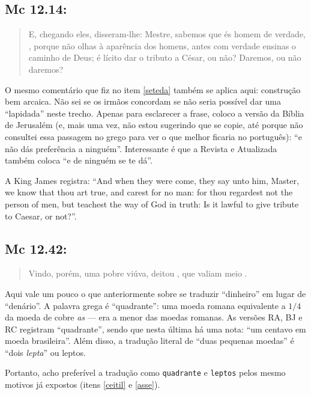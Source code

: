 \subsection*{Mc 12.14:}
\begin{quote}
    \small
E, chegando eles, disseram-lhe:  Mestre, sabemos que és homem de verdade, , porque não olhas à aparência dos homens, antes com verdade
 ensinas o caminho de Deus; é lícito dar o tributo a César, ou não?
 Daremos, ou não daremos?
\end{quote}

O mesmo comentário que fiz no item \ref{seteda}  também se aplica aqui:
construção bem arcaica. Não sei se os irmãos concordam se não seria
possível dar uma ``lapidada'' neste trecho. Apenas para esclarecer a
frase, coloco a versão da Bíblia de Jerusalém (e, mais uma vez, não
estou sugerindo que se copie, até porque não consultei essa passagem
no grego para ver o que melhor ficaria no português): ``e não dás
preferência a ninguém''. Interessante é que a Revista e Atualizada também coloca ``e de ninguém se te dá''.

A King James registra: ``And when they were come, they say unto him,
Master, we know that thou art true, and carest for no man: for thou
regardest not the person of men, but teachest the way of God in truth:
Is it lawful to give tribute to Caesar, or not?''.

\subsection*{Mc 12.42:}
\begin{quote}
    \small
Vindo, porém, uma pobre viúva, deitou , que valiam meio .
\end{quote}

Aqui vale um pouco o que anteriormente sobre se traduzir ``dinheiro''
em lugar de ``denário''. A palavra grega é ``quadrante'': uma moeda
romana equivalente a $1/4$ da moeda de cobre \emph{as} --- era a menor
das moedas romanas. As versões RA, BJ e RC registram ``quadrante'',
sendo que nesta última há uma nota: ``um centavo em moeda
brasileira''. Além disso, a tradução literal de ``duas pequenas
moedas'' é ``dois \emph{lepta}'' ou leptos.

Portanto, acho preferível a tradução como \texttt{quadrante} e \texttt{leptos} pelos mesmo motivos já expostos (itens \ref{ceitil} e \ref{asse}).

